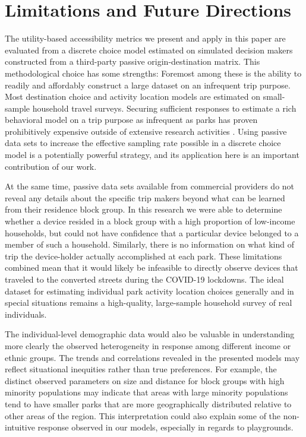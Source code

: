\documentclass[3p, authoryear, review]{elsarticle} %
\begin{document}
\hypertarget{limitations}{%
\section{Limitations and Future Directions}\label{limitations}}

The utility-based accessibility metrics we present and apply in this paper are
evaluated from a discrete choice model estimated on simulated decision makers
constructed from a third-party passive origin-destination matrix. This
methodological choice has some strengths: Foremost among these is the ability to
readily and affordably construct a large dataset on an infrequent trip purpose.
Most destination choice and activity location models are estimated on
small-sample household travel surveys. Securing sufficient responses to estimate
a rich behavioral model on a trip purpose as infrequent as parks has proven
prohibitively expensive outside of extensive research activities \citep[e.g.,][]{Kaczynski2016}. Using passive data sets to increase the effective sampling rate
possible in a discrete choice model is a potentially powerful strategy, and its
application here is an important contribution of our work.

At the same time, passive data sets available from commercial providers do not
reveal any details about the specific trip makers beyond what can be learned
from their residence block group. In this research we were able to determine
whether a device resided in a block group with a high proportion of low-income
households, but could not have confidence that a particular device belonged to a
member of such a household. Similarly, there is no information on what kind of
trip the device-holder actually accomplished at each park. These limitations
combined mean that it would likely be infeasible to directly observe devices
that traveled to the converted streets during the COVID-19 lockdowns. The ideal
dataset for estimating individual park activity location choices generally and
in special situations remains a high-quality, large-sample household survey of
real individuals.

The individual-level demographic data would also be valuable in understanding
more clearly the observed heterogeneity in response among different income or
ethnic groups. The trends and correlations revealed in the presented models may
reflect situational inequities rather than true preferences. For example, the
distinct observed parameters on size and distance for block groups with high
minority populations may indicate that areas with large minority populations
tend to have smaller parks that are more geographically distributed relative to
other areas of the region. This interpretation could also explain some of the
non-intuitive response observed in our models, especially in regards to
playgrounds.
\end{document}
